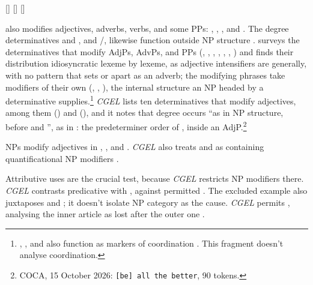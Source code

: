\documentclass[12pt]{article}
\begin{document}
\ea\label{ex:temporal-adjp}
\ea {} [] 
\ex {} []  [] 
\z\z

 also modifies adjectives, adverbs, verbs, and some PPs: , , , and  \citep[396--397]{huddleston2002}. The degree determinatives  and , and /, likewise function outside NP structure \citep[390, 395--397]{huddleston2002}. \textcite{reynolds2024why} surveys the determinatives that modify AdjPs, AdvPs, and PPs (, , , , , , ) and finds their distribution idiosyncratic lexeme by lexeme, as adjective intensifiers are generally, with no pattern that sets  or  apart as an adverb; the modifying phrases take modifiers of their own (, , ), the internal structure an NP headed by a determinative supplies.\footnote{, , and  also function as markers of coordination \citep[1305, 1308]{huddleston2002}. This fragment doesn't analyse coordination.} \textit{CGEL} lists ten determinatives that modify adjectives, among them  () and  (), and it notes that degree  occurs \enquote{as in NP structure, before  and }, as in  \citep[549]{huddleston2002}: the predeterminer order of , inside an AdjP.\footnote{COCA, 15 October 2026: \texttt{[be] all the better}, 90 tokens.}

NPs modify adjectives in , , and . \textit{CGEL} also treats  and  as containing quantificational NP modifiers \citep[549--550]{huddleston2002}.

Attributive uses are the crucial test, because \textit{CGEL} restricts NP modifiers there. \textit{CGEL} contrasts predicative  with , against permitted  \citep[551--552]{huddleston2002}. The excluded example also juxtaposes  and ; it doesn't isolate NP category as the cause. \textit{CGEL} permits , analysing the inner article as lost after the outer one \citep[p.~552, n.~8]{huddleston2002}.
\end{document}
